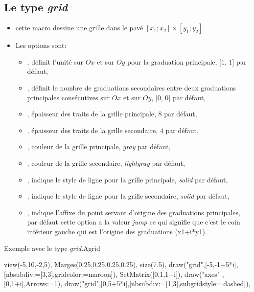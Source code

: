 \subsection{Le type \emph{grid}}\label{typegrid}

{\centering {}\par}

\begin{itemize}
 \item \desc cette macro dessine une grille dans le pavé $[x_1;x_2]\times [y_1;y_2]$. 
 \item Les options sont:
  \begin{itemize}
  \item {}, définit l'unité sur $Ox$ et sur $Oy$ pour la graduation principale, [$1$, $1$] par défaut,
  \item {}, définit le nombre de graduations secondaires entre deux graduations principales consécutives sur $Ox$ et sur $Oy$, [$0$, $0$] par défaut,
  \item {}, épaisseur des traits de la grille principale, $8$ par défaut,
  \item {}, épaisseur des traits de la grille secondaire, $4$ par défaut,
  \item {}, couleur de la grille principale, \emph{gray} par défaut,
  \item {}, couleur de la grille secondaire, \emph{lightgray} par défaut,
  \item {}, indique le style de ligne pour la grille principale, \emph{solid} par défaut,
  \item {}, indique le style de ligne pour la grille secondaire, \emph{solid} par défaut,
  \item {}, indique l'affixe du point servant d'origine des graduations principales, par défaut cette option a la valeur \emph{jump} ce qui signifie que c'est le coin inférieur gauche qui est l'origine des graduations (x1+i*y1).
  \end{itemize}
\end{itemize}

\begin{demo}{Exemple avec le type \emph{grid}.}{Agrid}
\begin{texgraph}[name=Agrid]
view(-5,10,-2,5), Marges(0.25,0.25,0.25,0.25), size(7.5),
draw("grid",[-5,-1+5*i],[nbsubdiv:=[3,3],gridcolor:=maroon]),
SetMatrix([0,1,1+i]),
draw("axes" ,[0,1+i],Arrows:=1),
draw("grid",[0,5+5*i],[nbsubdiv:=[1,3],subgridstyle:=dashed]),
\end{texgraph}
\end{demo}

